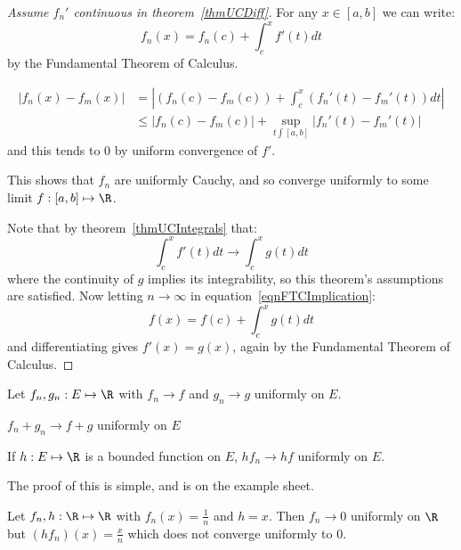\documentclass[../Main.tex]{subfiles}
\begin{document}
\begin{proof}[Assume $f_n'$ continuous in theorem~\ref{thmUCDiff}]
    For any $x \in [a, b]$ we can write:
    \begin{equation}
        f_n(x) = f_n(c) + \int_{c}^{x} f'(t) dt
        \label{eqnFTCImplication}
    \end{equation}
    by the Fundamental Theorem of Calculus.

    \begin{align*}
        |f_n(x) - f_m(x)| &= \left|\left(f_n(c) - f_m(c)\right) + \int_{c}^{x} \left(f_n'(t) - f_m'(t)\right) dt \right| \\
        &\leq |f_n(c) - f_m(c)| + \sup_{t \int [a, b]} \left|f_n'(t) - f_m'(t)\right|
    \end{align*}
    and this tends to $0$ by uniform convergence of $f'$.

    This shows that $f_n$ are uniformly Cauchy, and so converge uniformly to some limit $f : [a, b] \mapsto \R$.

    Note that by theorem~\ref{thmUCIntegrals} that:
    \begin{equation*}
        \int_{c}^{x} f'(t) dt \to \int_{c}^{x} g(t) dt
    \end{equation*}
    where the continuity of $g$ implies its integrability, so this theorem's assumptions are satisfied. Now letting $n \to \infty$ in equation~\ref{eqnFTCImplication}:
    \begin{equation*}
        f(x) = f(c) + \int_{c}^{x} g(t) dt 
    \end{equation*}
    and differentiating gives $f'(x) = g(x)$, again by the Fundamental Theorem of Calculus.
\end{proof}
\begin{propositions}{
        Let $f_n, g_n : E \mapsto \R$ with $f_n \to f$ and $g_n \to g$ uniformly on $E$.
    }
    \item $f_n + g_n \to f + g$ uniformly on $E$ \label{propUCSum}
    \item If $h : E \mapsto \R$ is a bounded function on $E$, $hf_n \to hf$ uniformly on $E$. \label{propUCMultiple}
    \label{propUCLinearity}
\end{propositions}
The proof of this is simple, and is on the example sheet.
\begin{example}
    Let $f_n, h : \R \mapsto \R$ with $f_n(x) = \frac{1}{n}$ and $h = x$. Then $f_n \to 0$ uniformly on $\R$ but $(hf_n)(x) = \frac{x}{n}$ which does not converge uniformly to $0$.
\end{example}
\end{document}
